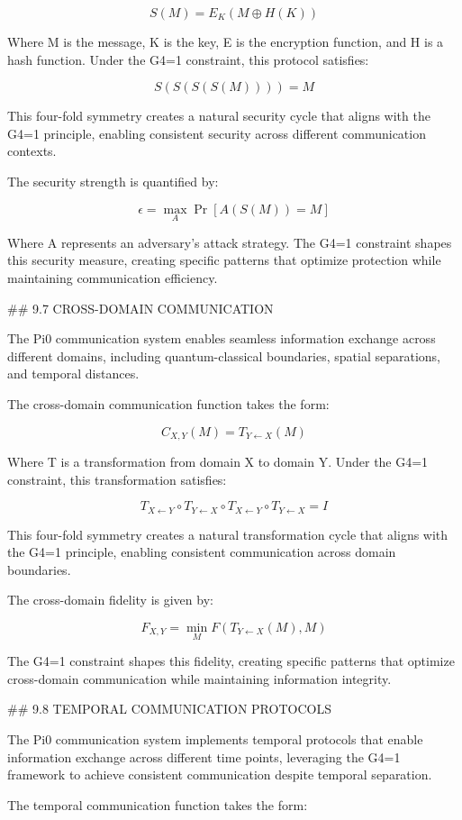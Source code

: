 $$S(M) = E_K(M \oplus H(K))$$

Where M is the message, K is the key, E is the encryption function, and H is a hash function. Under the G4=1 constraint, this protocol satisfies:

$$S(S(S(S(M)))) = M$$

This four-fold symmetry creates a natural security cycle that aligns with the G4=1 principle, enabling consistent security across different communication contexts.

The security strength is quantified by:

$$\epsilon = \max_{A} \Pr[A(S(M)) = M]$$

Where A represents an adversary's attack strategy. The G4=1 constraint shapes this security measure, creating specific patterns that optimize protection while maintaining communication efficiency.

## 9.7 CROSS-DOMAIN COMMUNICATION

The Pi0 communication system enables seamless information exchange across different domains, including quantum-classical boundaries, spatial separations, and temporal distances.

The cross-domain communication function takes the form:

$$C_{X,Y}(M) = T_{Y \leftarrow X}(M)$$

Where T is a transformation from domain X to domain Y. Under the G4=1 constraint, this transformation satisfies:

$$T_{X \leftarrow Y} \circ T_{Y \leftarrow X} \circ T_{X \leftarrow Y} \circ T_{Y \leftarrow X} = I$$

This four-fold symmetry creates a natural transformation cycle that aligns with the G4=1 principle, enabling consistent communication across domain boundaries.

The cross-domain fidelity is given by:

$$F_{X,Y} = \min_{M} F(T_{Y \leftarrow X}(M), M)$$

The G4=1 constraint shapes this fidelity, creating specific patterns that optimize cross-domain communication while maintaining information integrity.

## 9.8 TEMPORAL COMMUNICATION PROTOCOLS

The Pi0 communication system implements temporal protocols that enable information exchange across different time points, leveraging the G4=1 framework to achieve consistent communication despite temporal separation.

The temporal communication function takes the form:


